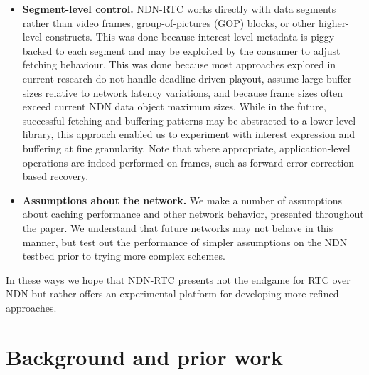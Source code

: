 \documentclass{icn/sig-alternate-2013} %
\newcommand{\ndnrtcName}{NDN-RTC} %
\begin{document}
\begin{itemize} 

\item \textbf{Segment-level control.}  \ndnrtcName{} works directly with data segments rather than video frames, group-of-pictures (GOP) blocks, or other higher-level constructs.  This was done because interest-level metadata is piggy-backed to each segment and may be exploited by the consumer to adjust fetching behaviour. %
This was done because most approaches explored in current research do not handle deadline-driven playout, assume large buffer sizes relative to network latency variations, and because frame sizes often exceed current NDN data object maximum sizes.  
While in the future, successful fetching and buffering patterns may be abstracted to a lower-level library, this approach enabled us to experiment with interest expression and buffering at fine granularity.  Note that where appropriate, application-level operations are indeed performed on frames, such as forward error correction based recovery. 

\item \textbf{Assumptions about the network.}  We make a number of  assumptions about caching performance and other network behavior, presented throughout the paper. We understand that future networks may not behave in this manner, but test out the performance of simpler assumptions on the NDN testbed prior to trying more complex schemes.  

\end{itemize}

In these ways we hope that \ndnrtcName{} presents not the endgame for RTC over NDN but rather offers an experimental platform for developing more refined approaches. 

\section{Background and prior work}
\label{sec:bg}

\end{document}
